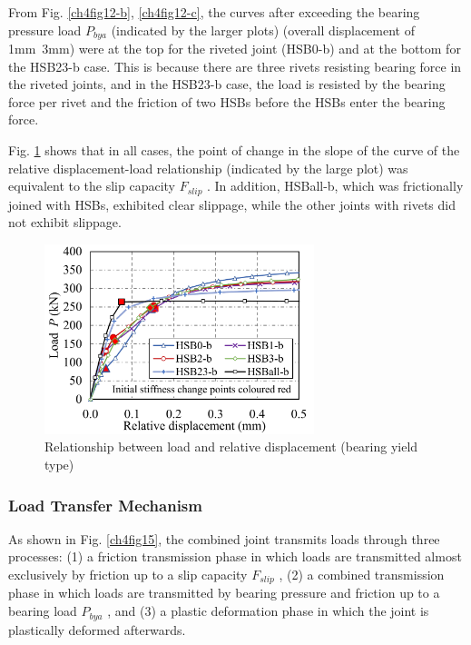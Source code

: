 From Fig. \ref{ch4fig12-b}, \ref{ch4fig12-c}, the curves after exceeding the bearing pressure load $P_{bya}$ (indicated by the larger plots) (overall displacement of 1mm~3mm) were at the top for the riveted joint (HSB0-b) and at the bottom for the HSB23-b case. This is because there are three rivets resisting bearing force in the riveted joints, and in the HSB23-b case, the load is resisted by the bearing force per rivet and the friction of two \ac{HSB}s before the \ac{HSB}s enter the bearing force.

Fig. \ref{ch4fig14} shows that in all cases, the point of change in the slope of the curve of the relative displacement-load relationship (indicated by the large plot) was equivalent to the slip capacity $F_{slip}$ . In addition, HSBall-b, which was frictionally joined with \ac{HSB}s, exhibited clear slippage, while the other joints with rivets did not exhibit slippage.

\begin{figure}[htbp]
    \centering
    \includegraphics[width=0.7\textwidth]{imgs/ch4/fig14.pdf}
    \caption{Relationship between load and relative displacement (bearing yield type)}
    \label{ch4fig14}
\end{figure}

\subsubsection{Load Transfer Mechanism}

As shown in Fig. \ref{ch4fig15}, the combined joint transmits loads through three processes: (1) a friction transmission phase in which loads are transmitted almost exclusively by friction up to a slip capacity $F_{slip}$ , (2) a combined transmission phase in which loads are transmitted by bearing pressure and friction up to a bearing load $P_{bya}$ , and (3) a plastic deformation phase in which the joint is plastically deformed afterwards.

